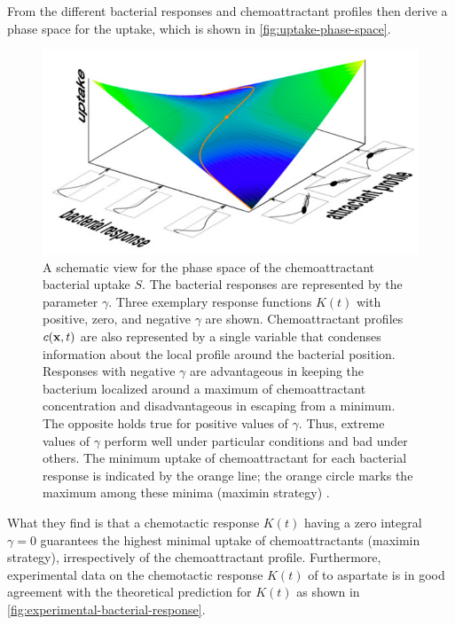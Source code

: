 From the different bacterial responses and chemoattractant profiles \citeauthor{celani:2010} then derive a phase space for the uptake, which is shown in \autoref{fig:uptake-phase-space}.

\begin{figure}[bth]
 \myfloatalign
 \includegraphics[width=0.8\linewidth]{gfx/uptake-phase-space}
 \caption[]{A schematic view for the phase space of the chemoattractant bacterial uptake $S$. The bacterial responses are represented by the parameter $\gamma$. Three exemplary response functions $K(t)$ with positive, zero, and negative $\gamma$ are shown. Chemoattractant profiles $c(\mathbf{x},t)$ are also represented by a single variable that condenses information about the local profile around the bacterial position. Responses with negative $\gamma$ are advantageous in keeping the bacterium localized around a maximum of chemoattractant concentration and disadvantageous in escaping from a minimum. The opposite holds true for positive values of $\gamma$. Thus, extreme values of $\gamma$ perform well under particular conditions and bad under others. The minimum uptake of chemoattractant for each bacterial response is indicated by the orange line; the orange circle marks the maximum among these minima (maximin strategy) \cite{celani:2010}.}\label{fig:uptake-phase-space}
\end{figure}

What they find is that a chemotactic response $K(t)$ having a zero integral $\gamma = 0$ guarantees the highest minimal uptake of chemoattractants (maximin strategy), irrespectively of the chemoattractant profile. Furthermore, experimental data on the chemotactic response $K(t)$ of \ecoli to aspartate is in good agreement with the theoretical prediction for $K(t)$ as shown in \autoref{fig:experimental-bacterial-response}.

